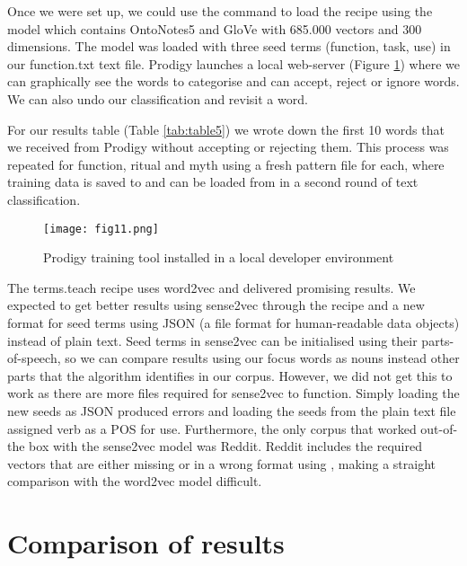 \documentclass[12pt, usenames, dvipsnames]{report}
\begin{document}
\begin{flushleft}
Once we were set up, we could use the command  to load the  recipe using the  model which contains OntoNotes5 and GloVe with 685.000 vectors and 300 dimensions.
The model was loaded with three seed terms (function, task, use) in our function.txt text file.
Prodigy launches a local web-server (Figure \ref{fig:figure11}) where we can graphically see the words to categorise and can accept, reject or ignore words.
We can also undo our classification and revisit a word.

For our results table (Table \ref{tab:table5}) we wrote down the first 10 words that we received from Prodigy without accepting or rejecting them.
This process was repeated for function, ritual and myth using a fresh pattern file for each, where training data is saved to and can be loaded from in a second round of text classification.

\vspace*{1.2em}
\begin{figure}[!htbp]
  \hspace*{-3.666em}
  \texttt{[image: fig11.png]}
  \caption{Prodigy training tool installed in a local developer environment}
  \label{fig:figure11}
\end{figure}
\vspace*{1.2em}

The terms.teach recipe uses word2vec and delivered promising results.
We expected to get better results using sense2vec through the  recipe and a new format for seed terms using JSON (a file format for human-readable data objects) instead of plain text.
Seed terms in sense2vec can be initialised using their parts-of-speech, so we can compare results using our focus words as nouns instead other parts that the algorithm identifies in our corpus.
However, we did not get this to work as there are more files required for sense2vec to function.
Simply loading the new seeds as JSON produced errors and loading the seeds from the plain text file assigned verb as a POS for use.
Furthermore, the only corpus that worked out-of-the box with the sense2vec model was Reddit.
Reddit includes the required vectors that are either missing or in a wrong format using , making a straight comparison with the word2vec model difficult.


\section{Comparison of results}


\end{flushleft}
\end{document}
